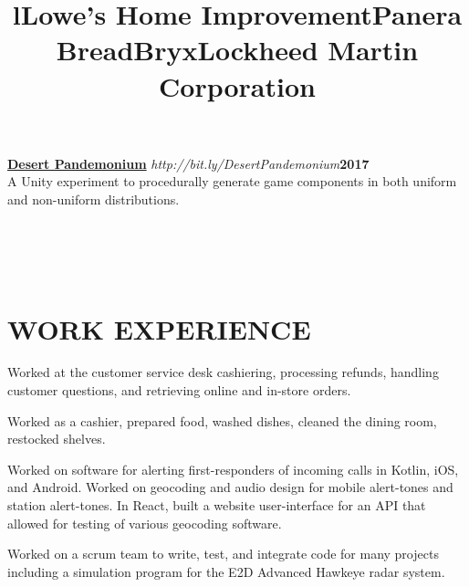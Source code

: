 \documentclass[line,margin]{res}
\begin{document}
\begin{resume}
	\par
    \href{https://github.com/MaeveMonster/DesertPandemonium}{\textbf{Desert Pandemonium}}
    {\sl http://bit.ly/DesertPandemonium}\hfill \textbf{2017}\\ 
    A Unity experiment to procedurally generate game components in both uniform and non-uniform distributions.


\begin{format}
\title{l}\\
\\
\body\\
\end{format}
\section{WORK EXPERIENCE}
\title{\textbf{Lowe's Home Improvement}}
\begin{position}
    Worked at the customer service desk cashiering, processing refunds, handling customer questions, and retrieving online and in-store orders.
\end{position}
\title{\textbf{Panera Bread}}
\begin{position}
    Worked as a cashier, prepared food, washed dishes, cleaned the dining room, restocked shelves.
\end{position}
\title{\textbf{Bryx}}
\begin{position}
    Worked on software for alerting first-responders of incoming calls in Kotlin, iOS, and Android. Worked on geocoding and audio design for mobile alert-tones and station alert-tones. In React, built a website user-interface for an API that allowed for testing of various geocoding software.
\end{position}
\title{\textbf{Lockheed Martin Corporation}}
\begin{position}
    Worked on a scrum team to write, test, and integrate code for many projects including a simulation program for the E2D Advanced Hawkeye radar system.
\end{position}


\end{resume}
\end{document}
